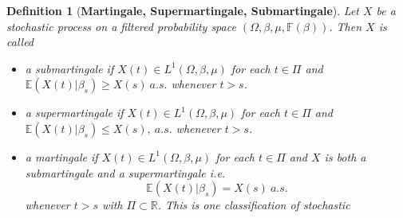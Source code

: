 \documentclass[a4 paper, 12pt]{report}
\theoremstyle{plain}
\newtheorem{definition}[theorem]{\textbf{Definition}}
\begin{document}
\begin{definition}[\textbf{Martingale, Supermartingale, Submartingale}]\label{1.4}
\normalfont
Let $X$ be a stochastic process on a filtered probability space $(\Omega,\beta,\mu,\mathbb{F}(\beta))$. Then $X$ is called
\begin{itemize}
\item[(i)] a submartingale if $X(t) \in L^1(\Omega,\beta,\mu)$ for each $t\in \Pi$ and $\mathbb{E}(X(t)|\beta_s)\geq X(s)~a.s.$ whenever $t>s$.
\item[(ii)] a supermartingale if $X(t) \in L^1(\Omega,\beta,\mu)$ for each $t\in \Pi$ and $\mathbb{E}(X(t)|\beta_s)\leq X(s),~a.s.$ whenever $t>s$.
\item[(iii)] a martingale if $X(t)\in L^1(\Omega,\beta,\mu)$ for each $t\in \Pi$ and $X$ is both a submartingale and a supermartingale i.e.
$$
\mathbb{E}(X(t)|\beta_s) = X(s)~a.s.
$$
whenever $t>s$ with $\Pi\subset\mathbb{R}$. This is one classification of stochastic
\end{itemize}
\end{definition}
\end{document}
